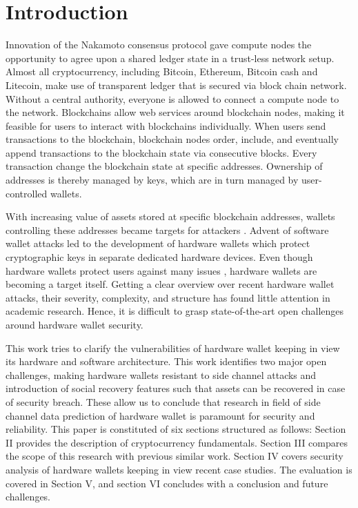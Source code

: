 \documentclass[conference]{IEEEtran}
\begin{document}
\section{Introduction}
Innovation of the Nakamoto consensus protocol gave compute nodes the opportunity to agree upon a shared ledger state in a trust-less 
network setup\cite{nakamoto2008bitcoin}. Almost all cryptocurrency, including Bitcoin, Ethereum, Bitcoin cash and Litecoin, make use 
of transparent ledger that is secured via block chain network. Without a central authority, everyone is allowed to connect a compute 
node to the network. Blockchains allow web services around blockchain nodes, making it feasible for users to interact with blockchains 
individually. When users send transactions to the blockchain, blockchain nodes order, include, and eventually append transactions to 
the blockchain state via consecutive blocks. Every transaction change the blockchain state at specific addresses\cite{julie2020blockchain}. 
Ownership of addresses is thereby managed by keys, which are in turn managed by user-controlled wallets.

With increasing value of assets stored at specific blockchain addresses, wallets controlling these addresses became targets for 
attackers \cite{arapinis2019formal}. Advent of software wallet attacks led to the development of hardware wallets which protect 
cryptographic keys in separate dedicated hardware devices. Even though hardware wallets protect users against many issues \cite{9014007}, 
hardware wallets are becoming a target itself. Getting a clear overview over recent hardware wallet attacks, their severity, complexity, 
and structure has found little attention in academic research. Hence, it is difficult to grasp state-of-the-art open challenges around 
hardware wallet security.

This work tries to clarify the vulnerabilities of hardware wallet keeping in view its hardware and software architecture. This work 
identifies two major open challenges, making hardware wallets resistant to side channel attacks and introduction of social recovery 
features such that assets can be recovered in case of security breach. These allow us to conclude that research in field of side channel 
data prediction of hardware wallet is paramount for security and reliability. This paper is constituted of six sections structured as 
follows: Section II provides the description of cryptocurrency fundamentals. Section III compares the scope of this research with 
previous similar work. Section IV covers security analysis of hardware wallets keeping in view recent case studies. The evaluation 
is covered in Section V, and section VI concludes with a conclusion and future challenges.
\end{document}
